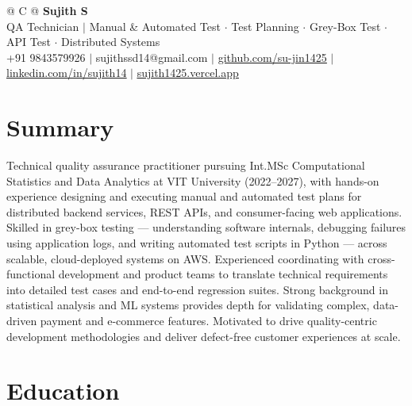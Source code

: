 \documentclass[a4paper,10pt]{article}
\newcommand{\ulink}[2]{\href{#1}{\uline{#2}}}
\begin{document}
\pagestyle{empty}

\begin{tabularx}{\linewidth}{@{} C @{}}
{\color[HTML]{000000}\fontsize{30}{35}\selectfont\bfseries Sujith S} \\[5pt]
{\fontsize{10.5}{12.5}\selectfont\color[HTML]{3A3A3A}
QA Technician $|$ Manual \& Automated Test $\cdot$ Test Planning $\cdot$ Grey-Box Test $\cdot$ API Test $\cdot$ Distributed Systems} \\[6pt]
{\fontsize{10.5}{12.5}\selectfont\textcolor[HTML]{3A3A3A}{
+91 9843579926 $|$
sujithssd14@gmail.com $|$
\ulink{https://github.com/su-jin1425}{github.com/su-jin1425} $|$
\ulink{https://linkedin.com/in/sujith14}{linkedin.com/in/sujith14} $|$
\ulink{https://sujith1425.vercel.app}{sujith1425.vercel.app}}}
\end{tabularx}

\vspace{2pt}

\section{Summary}
\vspace{5pt}
{\color[HTML]{0A0A0A}\fontsize{11}{14}\selectfont
Technical quality assurance practitioner pursuing Int.MSc Computational Statistics and Data Analytics at VIT University (2022--2027), with hands-on experience designing and executing manual and automated test plans for distributed backend services, REST APIs, and consumer-facing web applications. Skilled in grey-box testing — understanding software internals, debugging failures using application logs, and writing automated test scripts in Python — across scalable, cloud-deployed systems on AWS. Experienced coordinating with cross-functional development and product teams to translate technical requirements into detailed test cases and end-to-end regression suites. Strong background in statistical analysis and ML systems provides depth for validating complex, data-driven payment and e-commerce features. Motivated to drive quality-centric development methodologies and deliver defect-free customer experiences at scale.}

\vspace{2pt}

\section{Education}
\vspace{2pt}
\end{document}
